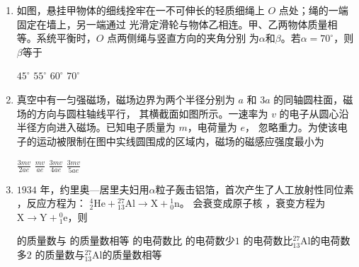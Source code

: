 \begin{enumerate}
\item
如图，悬挂甲物体的细线拴牢在一不可伸长的轻质细绳上 $ O $ 点处；绳的一端固定在墙上，另一端通过
光滑定滑轮与物体乙相连。甲、乙两物体质量相等。系统平衡时，$ O $ 点两侧绳与竖直方向的夹角分别
为$ \alpha $和$ \beta $。若$ \alpha =70 ^{ \circ } $，则$ \beta $等于  
\begin{figure}[h!]
\centering

\end{figure}


\fourchoices
{$ 45 ^{ \circ } $}
{$ 55 ^{ \circ } $}
{$ 60 ^{ \circ } $}
{$ 70 ^{ \circ } $}






\item
真空中有一匀强磁场，磁场边界为两个半径分别为 $ a $ 和 $ 3a $ 的同轴圆柱面，磁场的方向与圆柱轴线平行，
其横截面如图所示。一速率为 $ v $ 的电子从圆心沿半径方向进入磁场。已知电子质量为 $ m $，电荷量为 $ e $，
忽略重力。为使该电子的运动被限制在图中实线圆围成的区域内，磁场的磁感应强度最小为  
\begin{figure}[h!]
\centering

\end{figure}


\fourchoices
{$\frac{3 m v}{2 a e}$}
{$\frac{m v}{a e}$}
{$\frac{3 m v}{4 a e}$}
{$\frac{3 m v}{5 a e}$}







\item
$ 1934 $ 年，约里奥—居里夫妇用$ \alpha $粒子轰击铝箔，首次产生了人工放射性同位素  ，反应方程为：
${ }_{2}^{4} \mathrm{He}+{ }_{13}^{27} \mathrm{Al} \rightarrow \mathrm{X}+{ }_{0}^{1} \mathrm{n}$。  会衰变成原子核  ，衰变方程为 $\mathrm{X} \rightarrow \mathrm{Y}+{ }_{1}^{0} \mathrm{e}$，则  


\fourchoices
{ 的质量数与  的质量数相等}
{ 的电荷数比  的电荷数少$ 1 $}
{ 的电荷数比${ }_{13}^{27} \mathrm{Al}$的电荷数多$ 2 $}
{ 的质量数与${ }_{13}^{27} \mathrm{Al}$的质量数相等}





\end{enumerate}

